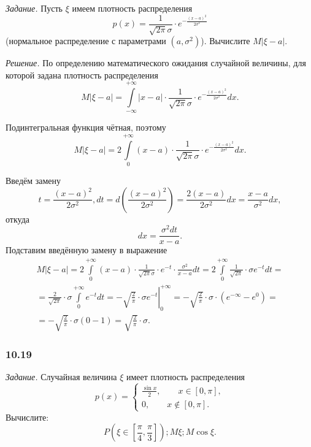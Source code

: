 \textit{Задание.} Пусть $ \xi $ имеем плотность распределения
$$p \left( x \right) =
\frac{1}{ \sqrt{2 \pi } \sigma } \cdot e^{- \frac{ \left( x-a \right)^2}{2 \sigma^2}}$$
(нормальное распределение с параметрами $ \left( a, \sigma^2 \right) $).
Вычислите $ M \left| \xi - a \right| $.

\textit{Решение.} По определению математического ожидания случайной величины, для которой задана плотность распределения
$$M \left| \xi - a \right| =
\int \limits_{- \infty }^{+ \infty } \left| x - a \right| \cdot \frac{1}{ \sqrt{2 \pi } \sigma } \cdot e^{- \frac{ \left( x - a \right)^2}{2 \sigma^2}} dx.$$

Подинтегральная функция чётная, поэтому
$$M \left| \xi - a \right| =
2 \int \limits_0^{+ \infty } \left( x - a \right) \cdot \frac{1}{ \sqrt{2 \pi } \sigma } \cdot e^{- \frac{ \left( x - a \right)^2}{2 \sigma^2}} dx.$$

Введём замену
$$t = \frac{ \left( x-a \right)^2}{2 \sigma^2},
dt = d \left( \frac{ \left( x-a \right)^2}{2 \sigma^2} \right) = \frac{2 \left( x-a \right) }{2 \sigma^2} dx = \frac{x-a}{ \sigma^2} dx,$$
откуда
$$dx = \frac{ \sigma^2 dt}{x-a}.$$
Подставим введённую замену в выражение
\begin{equation*}
\begin{split}
M \left| \xi - a \right| =
2 \int \limits_0^{+ \infty } \left( x-a \right) \cdot \frac{1}{ \sqrt{2 \pi } \sigma } \cdot e^{-t} \cdot \frac{ \sigma^2}{x-a} dt =
2 \int \limits_0^{+ \infty } \frac{1}{ \sqrt{2 \pi }} \cdot \sigma e^{-t} dt = \\
= \frac{2}{ \sqrt{2 \pi }} \cdot \sigma \int \limits_0^{+ \infty } e^{-t} dt =
\left. - \sqrt{ \frac{2}{ \pi }} \cdot \sigma e^{-t} \right|_0^{+ \infty } =
- \sqrt{ \frac{2}{ \pi }} \cdot \sigma \cdot \left( e^{- \infty } - e^0 \right) = \\
= - \sqrt{ \frac{2}{ \pi }} \cdot \sigma \left( 0 - 1 \right) =
\sqrt{ \frac{2}{ \pi }} \cdot \sigma.
\end{split}
\end{equation*}

\subsubsection*{10.19}

\textit{Задание.} Случайная величина $ \xi $ имеет плотность распределения
$$p \left( x \right) =
\begin{cases}
\frac{ \sin x}{2}, \qquad x \in \left[ 0, \pi \right], \\
0, \qquad x \notin \left[ 0, \pi \right].
\end{cases}$$
Вычислите:
$$P \left( \xi \in \left[ \frac{ \pi }{4}, \frac{ \pi }{3} \right] \right);
M \xi;
M \cos \xi.$$

